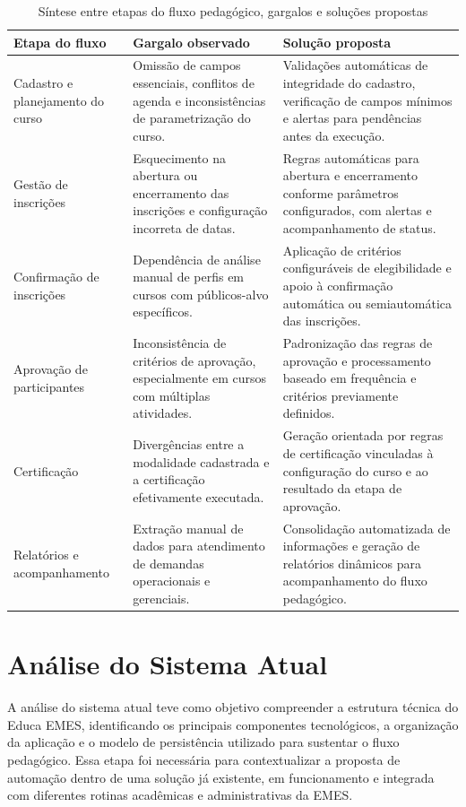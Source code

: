 \begin{table}[H]
\centering
\caption{Síntese entre etapas do fluxo pedagógico, gargalos e soluções propostas}
\label{tab:etapas-gargalos-solucoes}
\begin{tabular}{p{3.2cm} p{5.2cm} p{5.2cm}}
\hline
\textbf{Etapa do fluxo} & \textbf{Gargalo observado} & \textbf{Solução proposta} \\
\hline
Cadastro e planejamento do curso & Omissão de campos essenciais, conflitos de agenda e inconsistências de parametrização do curso. & Validações automáticas de integridade do cadastro, verificação de campos mínimos e alertas para pendências antes da execução. \\
\hline
Gestão de inscrições & Esquecimento na abertura ou encerramento das inscrições e configuração incorreta de datas. & Regras automáticas para abertura e encerramento conforme parâmetros configurados, com alertas e acompanhamento de status. \\
\hline
Confirmação de inscrições & Dependência de análise manual de perfis em cursos com públicos-alvo específicos. & Aplicação de critérios configuráveis de elegibilidade e apoio à confirmação automática ou semiautomática das inscrições. \\
\hline
Aprovação de participantes & Inconsistência de critérios de aprovação, especialmente em cursos com múltiplas atividades. & Padronização das regras de aprovação e processamento baseado em frequência e critérios previamente definidos. \\
\hline
Certificação & Divergências entre a modalidade cadastrada e a certificação efetivamente executada. & Geração orientada por regras de certificação vinculadas à configuração do curso e ao resultado da etapa de aprovação. \\
\hline
Relatórios e acompanhamento & Extração manual de dados para atendimento de demandas operacionais e gerenciais. & Consolidação automatizada de informações e geração de relatórios dinâmicos para acompanhamento do fluxo pedagógico. \\
\hline
\end{tabular}
\end{table}

\section{Análise do Sistema Atual}
\label{sec:metod:analise_sis}

A análise do sistema atual teve como objetivo compreender a estrutura
técnica do Educa EMES, identificando os principais componentes
tecnológicos, a organização da aplicação e o modelo de persistência
utilizado para sustentar o fluxo pedagógico. Essa etapa foi necessária
para contextualizar a proposta de automação dentro de uma solução já
existente, em funcionamento e integrada com diferentes rotinas
acadêmicas e administrativas da EMES.

